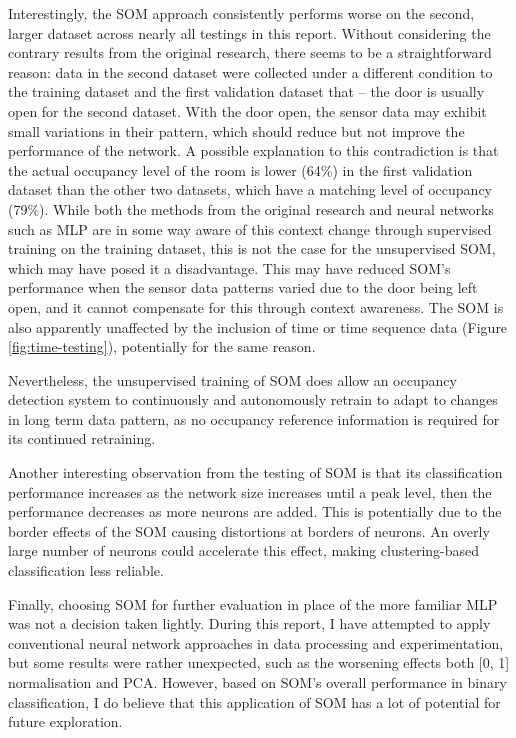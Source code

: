 \documentclass[10pt, oneside]{article}
\begin{document}
Interestingly, the SOM approach consistently performs worse on the second, larger dataset across nearly all testings in this report. Without considering the contrary results from the original research, there seems to be a straightforward reason: data in the second dataset were collected under a different condition to the training dataset and the first validation dataset that -- the door is usually open for the second dataset. With the door open, the sensor data may exhibit small variations in their pattern, which should reduce but not improve the performance of the network. A possible explanation to this contradiction is that the actual occupancy level of the room is lower (64\%) in the first validation dataset than the other two datasets, which have a matching level of occupancy (79\%). While both the methods from the original research and neural networks such as MLP are in some way aware of this context change through supervised training on the training dataset, this is not the case for the unsupervised SOM, which may have posed it a disadvantage. This may have reduced SOM's performance when the sensor data patterns varied due to the door being left open, and it cannot compensate for this through context awareness. The SOM is also apparently unaffected by the inclusion of time or time sequence data (Figure \ref{fig:time-testing}), potentially for the same reason.

Nevertheless, the unsupervised training of SOM does allow an occupancy detection system to continuously and autonomously retrain to adapt to changes in long term data pattern, as no occupancy reference information is required for its continued retraining. 

Another interesting observation from the testing of SOM is that its classification performance increases as the network size increases until a peak level, then the performance decreases as more neurons are added. This is potentially due to the border effects of the SOM \cite[Sec. 4.5]{kohonen2014matlab} causing distortions at borders of neurons. An overly large number of neurons could accelerate this effect, making clustering-based classification less reliable.

Finally, choosing SOM for further evaluation in place of the more familiar MLP was not a decision taken lightly. During this report, I have attempted to apply conventional neural network approaches in data processing and experimentation, but some results were rather unexpected, such as the worsening effects both [0, 1] normalisation and PCA. However, based on SOM's overall performance in binary classification, I do believe that this application of SOM has a lot of potential for future exploration.
\end{document}
